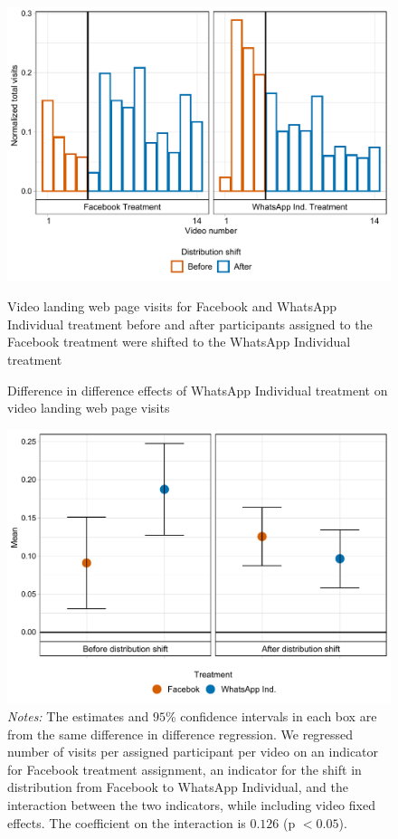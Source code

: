\documentclass[12pt]{article}
\begin{document}
\begin{figure}[H]
\caption{Video landing web page visits for Facebook and WhatsApp Individual treatment before and after participants assigned to the Facebook treatment were shifted to the WhatsApp Individual treatment} 
\includegraphics[width=1\textwidth]{Figures/Other/dist_change.pdf}
\captionsetup{width=.85\linewidth}
\label{fig:fb_shifts}
\end{figure}


\begin{figure}[H]
    \centering
    \caption{Difference in difference effects of WhatsApp Individual treatment on video landing web page visits}
    \includegraphics[width=12cm, height=9cm\textwidth]{Figures/Other/dist_dotted.pdf}
    \captionsetup{width=.75\linewidth}
    \caption*{\footnotesize  \textit{Notes:} The estimates and $95$\% confidence intervals in each box are from the same difference in difference regression. We regressed number of visits per assigned participant per video on an indicator for Facebook treatment assignment, an indicator for the shift in distribution from Facebook to WhatsApp Individual, and the interaction between the two indicators, while including video fixed effects. The coefficient on the interaction is $0.126$ (p $< 0.05$).}
\end{figure}
\end{document}
